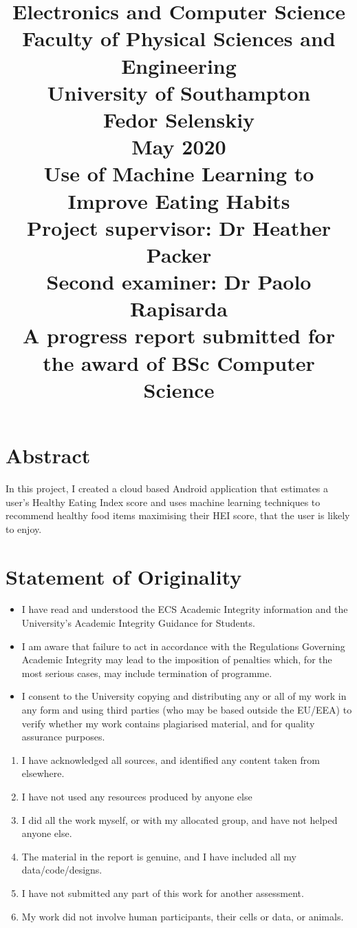 \documentclass{article}
\title{Electronics and Computer Science \\ Faculty of Physical Sciences and Engineering \\ University of Southampton \bigskip \bigskip \bigskip \bigskip \bigskip \bigskip \bigskip\\ Fedor Selenskiy \\ May 2020 \bigskip \bigskip \bigskip \bigskip \bigskip \bigskip \bigskip \\ Use of Machine Learning to Improve Eating Habits \bigskip \bigskip \bigskip \bigskip \bigskip \bigskip \bigskip\\ Project supervisor: Dr Heather Packer \\ Second examiner: Dr Paolo Rapisarda \\ A progress report submitted for the award of
BSc Computer Science}
\date{}
\begin{document}
\maketitle
\newpage

\newpage
\section{Abstract}
In this project, I created a cloud based Android application that estimates a user's Healthy Eating Index score and uses machine learning techniques to recommend healthy food items maximising their HEI score, that the user is likely to enjoy. 

\newpage
\section{Statement of Originality}
\bigskip
\begin{itemize}
    \item I have read and understood the ECS Academic Integrity information and the University’s
    Academic Integrity Guidance for Students.
    \item I am aware that failure to act in accordance with the Regulations Governing Academic Integrity
    may lead to the imposition of penalties which, for the most serious cases, may include
    termination of programme.
    \item I consent to the University copying and distributing any or all of my work in any form and
    using third parties (who may be based outside the EU/EEA) to verify whether my work
    contains plagiarised material, and for quality assurance purposes.
\end{itemize}
\bigskip

\begin{enumerate}
    \item I have acknowledged all sources, and identified any content taken from elsewhere.
    \item I have not used any resources produced by anyone else
    \item I did all the work myself, or with my allocated group, and have not helped anyone else.
    \item The material in the report is genuine, and I have included all my data/code/designs. 
    \item I have not submitted any part of this work for another assessment.
    \item My work did not involve human participants, their cells or data, or animals.
\end{enumerate}
\end{document}
